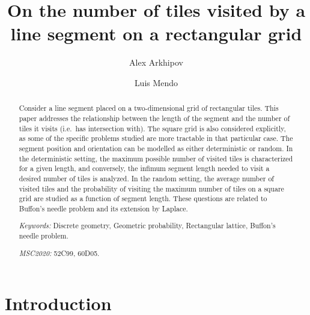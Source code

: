 \documentclass[12pt, a4paper]{article}
\begin{document}
\title{
On the number of tiles visited by a\\
line segment on a rectangular grid
}

\author[1]{Alex Arkhipov}
\author[2]{Luis Mendo}




\maketitle

\begin{abstract}
Consider a line segment placed on a two-dimensional grid of rectangular tiles. This paper addresses the relationship between the length of the segment and the number of tiles it visits (i.e.~has intersection with). The square grid is also considered explicitly, as some of the specific problems studied are more tractable in that particular case. The segment position and orientation can be modelled as either deterministic or random. In the deterministic setting, the maximum possible number of visited tiles is characterized for a given length, and conversely, the infimum segment length needed to visit a desired number of tiles is analyzed. In the random setting, the average number of visited tiles and the probability of visiting the maximum number of tiles on a square grid are studied as a function of segment length. These questions are related to Buffon's needle problem and its extension by Laplace. 

\emph{Keywords:} Discrete geometry, Geometric probability, Rectangular lattice, Buffon's needle problem.

\emph{MSC2020:} 52C99, 60D05.
\end{abstract}


\section{Introduction}
\label{part: intro}
\end{document}
